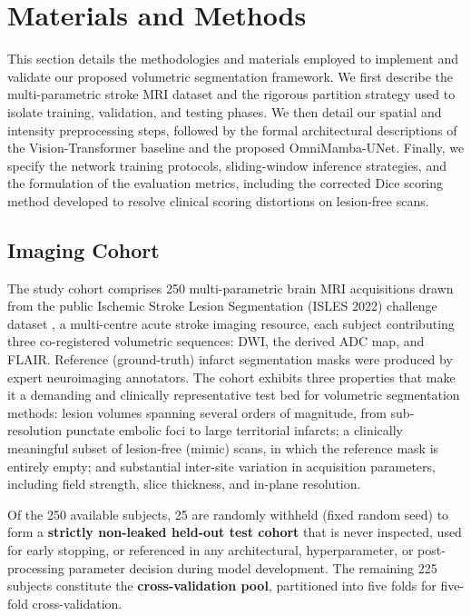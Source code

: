 \documentclass[pdflatex,sn-mathphys-num]{sn-jnl}
\begin{document}
\section{Materials and Methods}\label{sec:methods}

This section details the methodologies and materials employed to implement and validate our proposed volumetric segmentation framework. We first describe the multi-parametric stroke MRI dataset and the rigorous partition strategy used to isolate training, validation, and testing phases. We then detail our spatial and intensity preprocessing steps, followed by the formal architectural descriptions of the Vision-Transformer baseline and the proposed OmniMamba-UNet. Finally, we specify the network training protocols, sliding-window inference strategies, and the formulation of the evaluation metrics, including the corrected Dice scoring method developed to resolve clinical scoring distortions on lesion-free scans.

\subsection{Imaging Cohort}\label{ssec:dataset}
The study cohort comprises 250 multi-parametric brain MRI
acquisitions drawn from the public Ischemic Stroke Lesion Segmentation
(ISLES 2022) challenge dataset \citep{petzsche2022isles}, a multi-centre
acute stroke imaging resource, each subject contributing three
co-registered volumetric sequences: DWI, the derived ADC map, and
FLAIR. Reference (ground-truth) infarct segmentation masks were
produced by expert neuroimaging annotators. The cohort exhibits three
properties that make it a demanding and clinically representative
test bed for volumetric segmentation methods: lesion volumes spanning
several orders of magnitude, from sub-resolution punctate embolic
foci to large territorial infarcts; a clinically meaningful subset of
lesion-free (mimic) scans, in which the reference mask is entirely
empty; and substantial inter-site variation in acquisition parameters,
including field strength, slice thickness, and in-plane resolution.

Of the 250 available subjects, 25 are randomly withheld
(fixed random seed) to form a \textbf{strictly non-leaked held-out
test cohort} that is never inspected, used for early stopping, or
referenced in any architectural, hyperparameter, or post-processing
parameter decision during model development. The remaining 225
subjects constitute the \textbf{cross-validation pool}, partitioned
into five folds for five-fold cross-validation.
\end{document}
